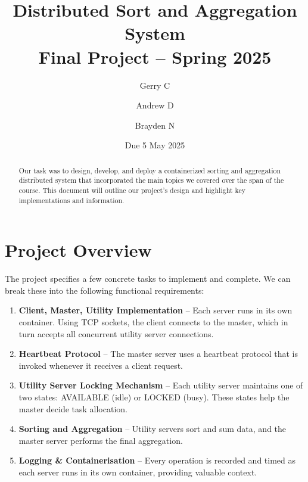 \documentclass{article}
\title{\textbf{Distributed Sort and Aggregation System}\\ \large Final Project -- Spring 2025}
\author{Gerry C \and Andrew D \and Brayden N}
\date{Due 5 May 2025}
\begin{document}
	\maketitle
	\thispagestyle{empty}
	
	\begin{abstract}
		Our task was to design, develop, and deploy a containerized sorting and aggregation distributed system that incorporated the main topics we covered over the span of the course. This document will outline our project's design and highlight key implementations and information.
	\end{abstract}
	
	\tableofcontents
	\newpage
	
	\section{Project Overview}
	The project specifies a few concrete tasks to implement and complete. We can break these into the following functional requirements:
	\begin{enumerate}
		\item \textbf{Client, Master, Utility Implementation} – Each server runs in its own container. Using TCP sockets, the client connects to the master, which in turn accepts all concurrent utility server connections.
		\item \textbf{Heartbeat Protocol} – The master server uses a heartbeat protocol that is invoked whenever it receives a client request.
		\item \textbf{Utility Server Locking Mechanism} – Each utility server maintains one of two states: AVAILABLE (idle) or LOCKED (busy). These states help the master decide task allocation.
		\item \textbf{Sorting and Aggregation} – Utility servers sort and sum data, and the master server performs the final aggregation.
		\item \textbf{Logging \& Containerisation} – Every operation is recorded and timed as each server runs in its own container, providing valuable context.
	\end{enumerate}
	
\end{document}
